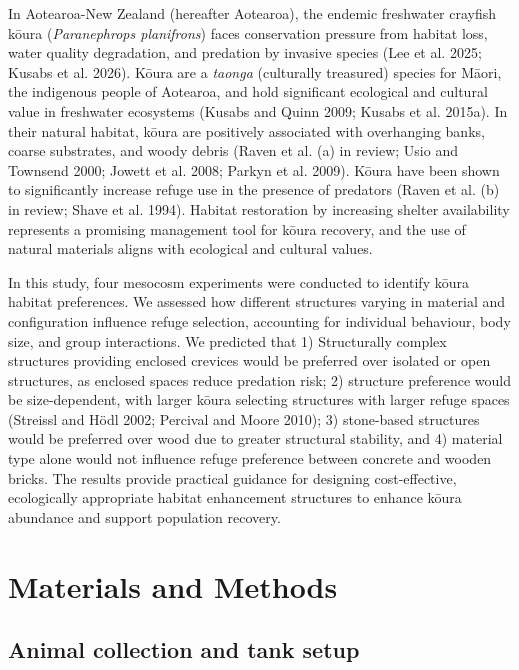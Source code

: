 \documentclass[
  12pt,
  a4paper,
]{scrbook}
\begin{document}
In Aotearoa-New Zealand (hereafter Aotearoa), the endemic freshwater
crayfish kōura (\emph{Paranephrops planifrons}) faces conservation
pressure from habitat loss, water quality degradation, and predation by
invasive species (Lee et al. 2025; Kusabs et al. 2026). Kōura are a
\emph{taonga} (culturally treasured) species for Māori, the indigenous
people of Aotearoa, and hold significant ecological and cultural value
in freshwater ecosystems (Kusabs and Quinn 2009; Kusabs et al. 2015a).
In their natural habitat, kōura are positively associated with
overhanging banks, coarse substrates, and woody debris (Raven et al. (a)
in review; Usio and Townsend 2000; Jowett et al. 2008; Parkyn et al.
2009). Kōura have been shown to significantly increase refuge use in the
presence of predators (Raven et al. (b) in review; Shave et al. 1994).
Habitat restoration by increasing shelter availability represents a
promising management tool for kōura recovery, and the use of natural
materials aligns with ecological and cultural values.

In this study, four mesocosm experiments were conducted to identify
kōura habitat preferences. We assessed how different structures varying
in material and configuration influence refuge selection, accounting for
individual behaviour, body size, and group interactions. We predicted
that 1) Structurally complex structures providing enclosed crevices
would be preferred over isolated or open structures, as enclosed spaces
reduce predation risk; 2) structure preference would be size-dependent,
with larger kōura selecting structures with larger refuge spaces
(Streissl and Hödl 2002; Percival and Moore 2010); 3) stone-based
structures would be preferred over wood due to greater structural
stability, and 4) material type alone would not influence refuge
preference between concrete and wooden bricks. The results provide
practical guidance for designing cost-effective, ecologically
appropriate habitat enhancement structures to enhance kōura abundance
and support population recovery.


\chapter{Materials and Methods}\label{materials-and-methods-2}

\section{Animal collection and tank
setup}\label{animal-collection-and-tank-setup}
\end{document}
